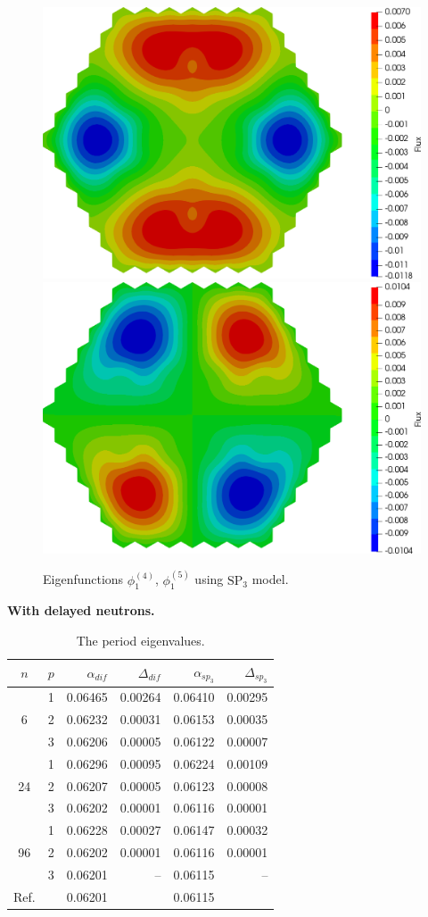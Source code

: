 \documentclass[authoryear]{elsarticle}
\begin{document}
\begin{figure}[H]
\begin{center}
	\includegraphics[width=0.49\linewidth]{iaea_without/alpha_sp3_u1_4_without.png}
	\includegraphics[width=0.49\linewidth]{iaea_without/alpha_sp3_u1_5_without.png}\\
	\caption{Eigenfunctions $\phi_1^{(4)}$, $\phi_1^{(5)}$ using $\mathrm{SP_3}$ model.}
	\label{fig:iaea_without_fun_3}
\end{center}
\end{figure}

\textbf{With delayed neutrons.}
\begin{table}[h]
\caption{The period eigenvalues.}
\label{tab:iaea_without_alpha_del}
\begin{center}
\begin{tabular}{c c r r r r}
\hline
$n$ & $p$ & $\alpha_{dif}$ & $\Delta_{dif}$ &$\alpha_{sp_3}$& $\Delta_{sp_3}$ \\
\hline
	& 1	&0.06465 &0.00264&0.06410 & 0.00295\\
6	& 2	&0.06232 &0.00031&0.06153 & 0.00035\\
	& 3	&0.06206 &0.00005&0.06122 & 0.00007\\ 
\hline
	& 1	&0.06296 &0.00095&0.06224 & 0.00109\\
24& 2	&0.06207 &0.00005&0.06123 & 0.00008\\
	& 3	&0.06202 &0.00001&0.06116 & 0.00001\\ 
\hline
	& 1	&0.06228 &0.00027&0.06147 & 0.00032\\
96& 2	&0.06202 &0.00001&0.06116 & 0.00001\\
	& 3	&0.06201 &     --&0.06115 &      --\\ 
\hline
Ref.& & 0.06201 & & 0.06115 \\ 
\hline
\end{tabular}
\end{center}
\end{table}
\end{document}
